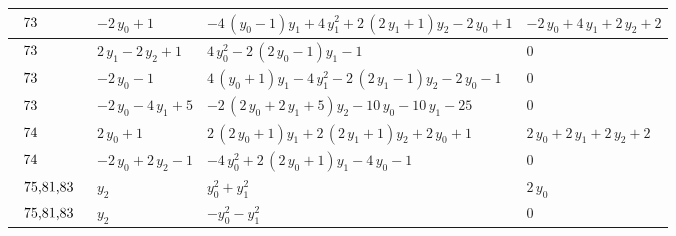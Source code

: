 \begin{table}[H]
\begin{center}
{\begin{tabular}{|l|l|l|l|}
$\begin{tabular}{l}
73 \\
\end{tabular}$ & $ -2 \, y_{0} + 1 $ & $ -4 \, {\left(y_{0} - 1\right)} y_{1} + 4 \, y_{1}^{2} + 2 \, {\left(2 \, y_{1} + 1\right)} y_{2} - 2 \, y_{0} + 1 $ & $ -2 \, y_{0} + 4 \, y_{1} + 2 \, y_{2} + 2 $ \\ \hline
$\begin{tabular}{l}
73 \\
\end{tabular}$ & $ 2 \, y_{1} - 2 \, y_{2} + 1 $ & $ 4 \, y_{0}^{2} - 2 \, {\left(2 \, y_{0} - 1\right)} y_{1} - 1 $ & $ 0 $ \\ \hline
$\begin{tabular}{l}
73 \\
\end{tabular}$ & $ -2 \, y_{0} - 1 $ & $ 4 \, {\left(y_{0} + 1\right)} y_{1} - 4 \, y_{1}^{2} - 2 \, {\left(2 \, y_{1} - 1\right)} y_{2} - 2 \, y_{0} - 1 $ & $ 0 $ \\ \hline
$\begin{tabular}{l}
73 \\
\end{tabular}$ & $ -2 \, y_{0} - 4 \, y_{1} + 5 $ & $ -2 \, {\left(2 \, y_{0} + 2 \, y_{1} + 5\right)} y_{2} - 10 \, y_{0} - 10 \, y_{1} - 25 $ & $ 0 $ \\ \hline
$\begin{tabular}{l}
74 \\
\end{tabular}$ & $ 2 \, y_{0} + 1 $ & $ 2 \, {\left(2 \, y_{0} + 1\right)} y_{1} + 2 \, {\left(2 \, y_{1} + 1\right)} y_{2} + 2 \, y_{0} + 1 $ & $ 2 \, y_{0} + 2 \, y_{1} + 2 \, y_{2} + 2 $ \\ \hline
$\begin{tabular}{l}
74 \\
\end{tabular}$ & $ -2 \, y_{0} + 2 \, y_{2} - 1 $ & $ -4 \, y_{0}^{2} + 2 \, {\left(2 \, y_{0} + 1\right)} y_{1} - 4 \, y_{0} - 1 $ & $ 0 $ \\ \hline
$\begin{tabular}{l}
75,81,83 \\
\end{tabular}$ & $ y_{2} $ & $ y_{0}^{2} + y_{1}^{2} $ & $ 2 \, y_{0} $ \\ \hline
$\begin{tabular}{l}
75,81,83 \\
\end{tabular}$ & $ y_{2} $ & $ -y_{0}^{2} - y_{1}^{2} $ & $ 0 $ \\ \hline

\end{tabular}}
\end{center}
\end{table}
